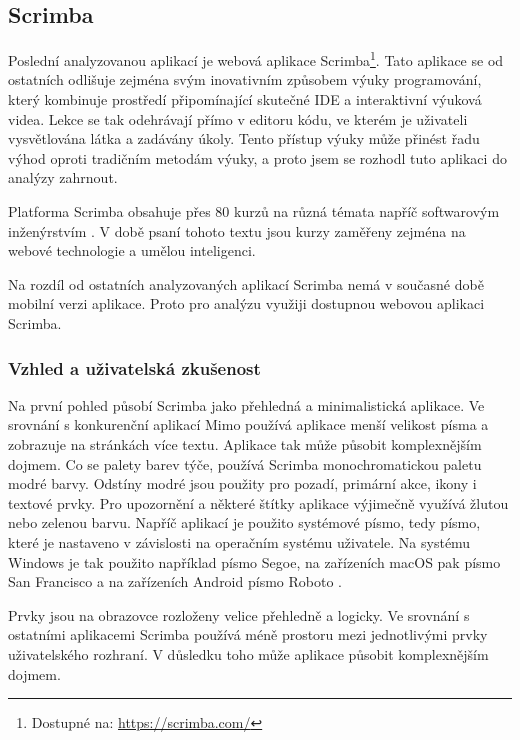 \subsection{Scrimba}

Poslední analyzovanou aplikací je webová aplikace Scrimba\footnote{Dostupné na: \href{https://scrimba.com/}{https://scrimba.com/}}. Tato aplikace se od ostatních odlišuje zejména svým inovativním způsobem výuky programování, který kombinuje prostředí připomínající skutečné IDE a interaktivní výuková videa. Lekce se tak odehrávají přímo v editoru kódu, ve kterém je uživateli vysvětlována látka a zadávány úkoly. Tento přístup výuky může přinést řadu výhod oproti tradičním metodám výuky, a proto jsem se rozhodl tuto aplikaci do analýzy zahrnout.

Platforma Scrimba obsahuje přes 80 kurzů na různá témata napříč softwarovým inženýrstvím \cite{ScrimbaCourses}. V době psaní tohoto textu jsou kurzy zaměřeny zejména na webové technologie a umělou inteligenci.

Na rozdíl od ostatních analyzovaných aplikací Scrimba nemá v současné době mobilní verzi aplikace. Proto pro analýzu využiji dostupnou webovou aplikaci Scrimba. 

\subsubsection{Vzhled a uživatelská zkušenost}


Na první pohled působí Scrimba jako přehledná a minimalistická aplikace. Ve srovnání s konkurenční aplikací Mimo používá aplikace menší velikost písma a zobrazuje na stránkách více textu. Aplikace tak může působit komplexnějším dojmem. Co se palety barev týče, používá Scrimba monochromatickou paletu modré barvy. Odstíny modré jsou použity pro pozadí, primární akce, ikony i textové prvky. Pro upozornění a některé štítky aplikace výjimečně využívá žlutou nebo zelenou barvu. Napříč aplikací je použito systémové písmo, tedy písmo, které je nastaveno v závislosti na operačním systému uživatele. Na systému Windows je tak použito například písmo Segoe, na zařízeních macOS pak písmo San Francisco a na zařízeních Android písmo Roboto \cite{SystemFontWebSafeFont}.

Prvky jsou na obrazovce rozloženy velice přehledně a logicky. Ve srovnání s ostatními aplikacemi Scrimba používá méně prostoru mezi jednotlivými prvky uživatelského rozhraní. V důsledku toho může aplikace působit komplexnějším dojmem.

